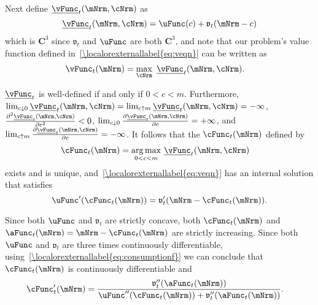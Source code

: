 \documentclass[\econtexRoot/BufferStockTheory]{subfiles}
\begin{document}
Next define $\underline{\vFunc}_{t}(\mNrm,\cNrm)$ as
\begin{equation}
\underline{\vFunc}_{t}(\mNrm,\cNrm)=\uFunc(c)+\mathfrak{v}_{t}(\mNrm-c)
\end{equation}
which is $\mathbf{C}^{3}$ since $\mathfrak{v}_{t}$ and $\uFunc$ are both
$\mathbf{C}^{3}$, and note that our problem's value function defined
in~\eqref{\localorexternallabel{eq:veqn}} can be written as
\begin{equation}\begin{gathered}\begin{aligned}
\vFunc_{t}(\mNrm)  & =  \max_{\cNrm}~\underline{\vFunc}_{t}(\mNrm,\cNrm).
\end{aligned}\end{gathered}\end{equation}

$\underline{\vFunc}_{t}$ is well-defined if and only if $0<c<m$.  Furthermore,
$\lim_{c \downarrow
  0}\underline{\vFunc}_{t}(\mNrm,\cNrm)=\lim_{c\uparrow m} \underline{\vFunc}_{t}(\mNrm,\cNrm)=-\infty $, $\frac{\partial ^{2}\underline{\vFunc}_{t}(\mNrm,\cNrm)}{\partial c^{2}}%
<0$, $\lim_{c \downarrow 0}\frac{\partial \underline{\vFunc}_{t}(\mNrm,\cNrm)}{\partial c}%
=+\infty $, and $\lim_{c\uparrow m} \frac{\partial \underline{\vFunc}_{t}(\mNrm,\cNrm)}{%
\partial c}=-\infty $. It follows that the $\cFunc_{t}(\mNrm)$ defined by
\begin{equation}\begin{gathered}\begin{aligned}
\cFunc_{t}(\mNrm)  & = \underset{0<c<m}{\arg \max }~\underline{\vFunc}_{t}(\mNrm,\cNrm)
\end{aligned}\end{gathered}\end{equation}
exists and is unique, and~\eqref{\localorexternallabel{eq:veqn}} has an internal
solution that satisfies
\begin{equation}
\uFunc^{\prime }(\cFunc_{t}(\mNrm))=\mathfrak{v}_{t}^{\prime }(\mNrm-\cFunc_{t}(\mNrm))  \label{eq:consumptionf}.
\end{equation}


Since both $\uFunc$ and $\mathfrak{v}_{t}$ are strictly concave, both
$\cFunc_{t}(\mNrm)$ and $\aFunc_{t}(\mNrm)=\mNrm-\cFunc_{t}(\mNrm)$
are strictly increasing. Since both $\uFunc$ and $\mathfrak{v}_{t}$ are
three times continuously differentiable, using~\eqref{\localorexternallabel{eq:consumptionf}} we can conclude that
$\cFunc_{t}(\mNrm)$ is continuously differentiable and
\begin{equation}\begin{gathered}\begin{aligned}
\cFunc_{t}^{\prime }(\mNrm)  & = \frac{\mathfrak{v}_{t}^{\prime \prime }({\aFunc}_{t}(\mNrm))  }{\uFunc^{\prime \prime }(\cFunc_{t}(\mNrm))+\mathfrak{v}_{t}^{\prime \prime }({\aFunc}_{t}(\mNrm))}.
\end{aligned}\end{gathered}\end{equation}
\end{document}
